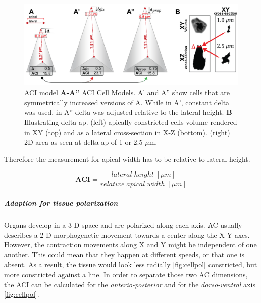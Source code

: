 \documentclass[11pt,singlespacinge,twoside]{reedthesis} %
\begin{document}
\begin{figure}

{\centering \includegraphics[width=0.75\linewidth]{figures/summary/aci_fig-01} 

}

\caption[ACI Cell Models]{ACI model \textbf{A-A''} ACI Cell Models. A' and A'' show cells that are symmetrically increased versions of A. While in A', constant delta was used, in A'' delta was adjusted relative to the lateral height. \textbf{B} Illustrating delta ap. (left) apically constricted cells volume rendered in XY (top) and as a lateral cross-section in X-Z (bottom). (right) 2D area as seen at delta ap of 1 or 2.5 \(\mu\)m.}\label{fig:ACICells}
\end{figure}
Therefore the measurement for apical width has to be relative to lateral height.

\[\mathbf{ACI} = \frac{lateral\;height\;[\mu m]}{relative\;apical\;width\;[\mu m]}\]

\hypertarget{ACI-pol}{%
\subparagraph{Adaption for tissue polarization}\label{ACI-pol}}

Organs develop in a 3-D space and are polarized along each axis. AC usually describes a 2-D morphogenetic movement towards a center along the X-Y axes. However, the contraction movements along X and Y might be independent of one another. This could mean that they happen at different speeds, or that one is absent. As a result, the tissue would look less radially \ref{fig:cellpol} constricted, but more constricted against a line. In order to separate those two AC dimensions, the ACI can be calculated for the \emph{anterio-posterior} and for the \emph{dorso-ventral} axis \ref{fig:cellpol}.
\end{document}
